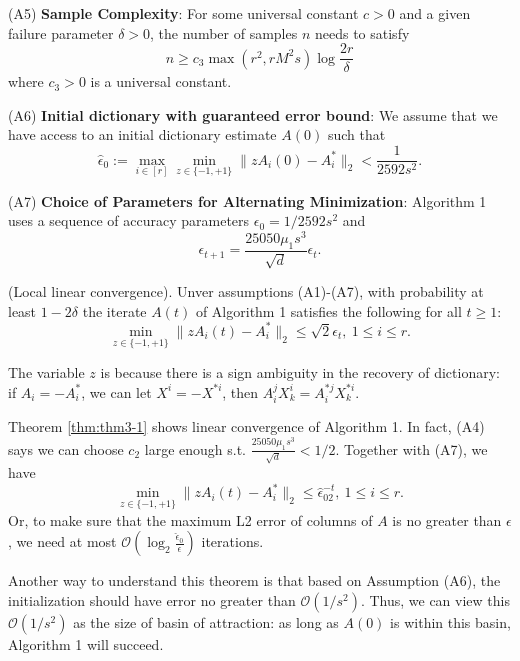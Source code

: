 (A5) \textbf{Sample Complexity}: For some universal constant $c>0$ and a given failure parameter $\delta >0$, the number of samples $n$ needs to satisfy
\begin{equation*}
n\geq c_3 \max(r^2,rM^2s)\log\frac{2r}{\delta}
\end{equation*}
where $c_3>0$ is a universal constant.

(A6) \textbf{Initial dictionary with guaranteed error bound}: We assume that we have access to an initial dictionary estimate $A(0)$ such that
\begin{equation*}
\hat{\epsilon}_0:=\max_{i\in [r]}\min_{z\in \{-1,+1\}}\lVert zA_i(0)-A_i^*\rVert_2<\frac{1}{2592s^2}.
\end{equation*}

(A7) \textbf{Choice of Parameters for Alternating Minimization}: Algorithm 1 uses a sequence of accuracy parameters $\epsilon_0=1/2592s^2$ and 
\begin{equation*}
\epsilon_{t+1}=\frac{25050\mu_1s^3}{\sqrt{d}}\epsilon_t.
\end{equation*}

\begin{theorem}
(Local linear convergence). Unver assumptions (A1)-(A7), with probability at least $1-2\delta$ the iterate $A(t)$ of Algorithm 1 satisfies the following for all $t\geq 1$:
\begin{equation*}
\min_{z\in \{-1,+1\}}\lVert zA_i(t)-A_i^*\rVert_2\leq \sqrt{2}\epsilon_t,~1\leq i \leq r.
\end{equation*}
\label{thm:thm3-1}
\end{theorem}

The variable $z$ is because there is a sign ambiguity in the recovery of dictionary: if $A_i=-A_i^*$, we can let $X^i=-X^{*i}$, then $A^j_iX^i_k=A^{*j}_iX^{*i}_k$.

Theorem \ref{thm:thm3-1} shows linear convergence of Algorithm 1. In fact, (A4) says we can choose $c_2$ large enough s.t. $\frac{25050\mu_1s^3}{\sqrt{d}}<1/2$. Together with (A7), we have
\begin{equation*}
\min_{z\in \{-1,+1\}}\lVert zA_i(t)-A_i^*\rVert_2\leq \hat{\epsilon}_02^{-t},~1\leq i \leq r.
\end{equation*}
Or, to make sure that the maximum L2 error of columns of $A$ is no greater than $\epsilon$, we need at most $\mathcal{O}(\log_2\frac{\hat{\epsilon}_0}{\epsilon})$ iterations.

Another way to understand this theorem is that based on Assumption (A6), the initialization should have error no greater than $\mathcal{O}(1/s^2)$. Thus, we can view this $\mathcal{O}(1/s^2)$ as the size of basin of attraction: as long as $A(0)$ is within this basin, Algorithm 1 will succeed.

